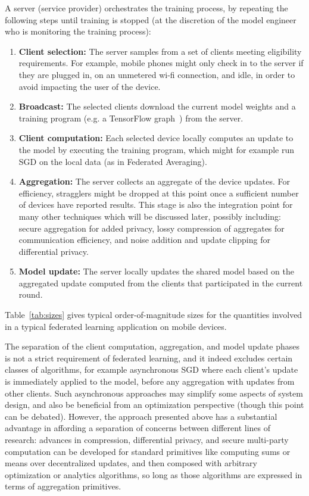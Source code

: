 \documentclass[11pt]{article}
\begin{document}
A server (service provider) orchestrates the training process, by repeating the following steps until training is stopped (at the discretion of the model engineer who is monitoring the training process):
\begin{enumerate}

  \item \textbf{Client selection:} The server samples from a set of clients meeting eligibility requirements. For example, mobile phones might only check in to the server if they are plugged in, on an unmetered wi-fi connection, and idle, in order to avoid impacting the user of the device.
  
  \item \textbf{Broadcast:} The selected clients download the current model weights and a training program (e.g. a TensorFlow graph~\cite{tensorflow2015-whitepaper}) from the server.
  
  \item \textbf{Client computation:} Each selected device locally computes an update to the model by executing the training program, which might for example run SGD on the local data (as in Federated Averaging).
  
  \item \textbf{Aggregation:} The server collects an aggregate of the device updates. For efficiency, stragglers might be dropped at this point once a sufficient number of devices have reported results. This stage is also the integration point for many other techniques which will be discussed later, possibly including: secure aggregation for added privacy, lossy compression of aggregates for communication efficiency, and noise addition and update clipping for differential privacy.
  
  \item \textbf{Model update:} The server locally updates the shared model based on the aggregated update computed from the clients that participated in the current round.
\end{enumerate}

Table~\ref{tab:sizes} gives typical order-of-magnitude sizes for the quantities involved in a typical federated learning application on mobile devices.

The separation of the client computation, aggregation, and model update phases is not a strict requirement of federated learning, and it indeed excludes certain classes of algorithms, for example asynchronous SGD where each client's update is immediately applied to the model, before any aggregation with updates from other clients. Such asynchronous approaches may simplify some aspects of system design, and also be beneficial from an optimization perspective (though this point can be debated). However, the approach presented above has a substantial advantage in affording a separation of concerns between different lines of research: advances in compression, differential privacy, and secure multi-party computation can be developed for standard primitives like computing sums or means over decentralized updates, and then composed with arbitrary optimization or analytics algorithms, so long as those algorithms are expressed in terms of aggregation primitives.
\end{document}
